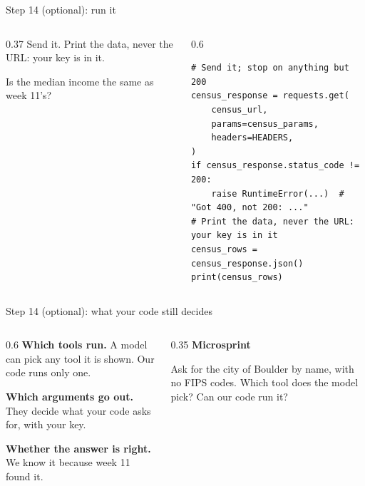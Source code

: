 \documentclass[9pt,aspectratio=169]{beamer}
\begin{document}
\begin{frame}[fragile]{Step 14 (optional): run it}
    \begin{columns}[T]
        \begin{column}{0.37\textwidth}
            Send it. Print the data, never the URL: your key is in it.

            \medskip
            Is the median income the same as week 11's?
        \end{column}
        \begin{column}{0.6\textwidth}
\begin{lstlisting}
# Send it; stop on anything but 200
census_response = requests.get(
    census_url,
    params=census_params,
    headers=HEADERS,
)
if census_response.status_code != 200:
    raise RuntimeError(...)  # "Got 400, not 200: ..."
# Print the data, never the URL: your key is in it
census_rows = census_response.json()
print(census_rows)
\end{lstlisting}
        \end{column}
    \end{columns}
\end{frame}

\begin{frame}{Step 14 (optional): what your code still decides}
    \begin{columns}[T]
        \begin{column}{0.6\textwidth}
            \textbf{Which tools run.} A model can pick any tool it is shown. Our code runs only one.

            \medskip
            \textbf{Which arguments go out.} They decide what your code asks for, with your key.

            \medskip
            \textbf{Whether the answer is right.} We know it because week 11 found it.
        \end{column}
        \begin{column}{0.35\textwidth}
            \textbf{Microsprint}\\[2pt]
            {\footnotesize Ask for the city of Boulder by name, with no FIPS codes. Which tool does the model pick? Can our code run it?\par}
        \end{column}
    \end{columns}
\end{frame}
\end{document}

